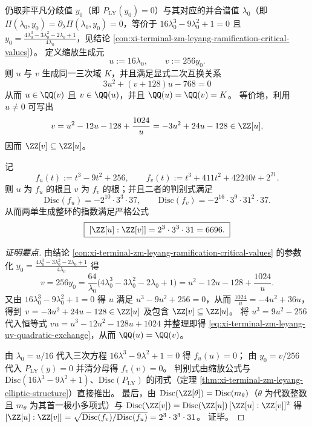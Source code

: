 \begin{conclusion}\label{con:xi-terminal-zm-leyang-uv-quadratic-exchange-index}
仍取非平凡分歧值 \(y_0\)（即 \(P_{\mathrm{LY}}(y_0)=0\)）与其对应的并合谱值 \(\lambda_0\)（即 \(\Pi(\lambda_0,y_0)=\partial_\lambda\Pi(\lambda_0,y_0)=0\)，等价于 \(16\lambda_0^3-9\lambda_0^2+1=0\) 且 \(y_0=\frac{4\lambda_0^3-3\lambda_0^2-2\lambda_0+1}{4\lambda_0}\)，见结论 \ref{con:xi-terminal-zm-leyang-ramification-critical-values}）。
定义缩放生成元
\[
u:=16\lambda_0,\qquad v:=256y_0.
\]
则 \(u\) 与 \(v\) 生成同一三次域 \(K\)，并且满足显式二次互换关系
\begin{equation}\label{eq:xi-terminal-zm-leyang-uv-quadratic-exchange}
\boxed{\;
3u^2+(v+128)u-768=0\;}
\end{equation}
从而 \(u\in\QQ(v)\) 且 \(v\in\QQ(u)\)，并且 \(\QQ(u)=\QQ(v)=K\)。
等价地，利用 \(u\neq 0\) 可写出
\[
v=u^2-12u-128+\frac{1024}{u}=-3u^2+24u-128\in\ZZ[u],
\]
因而 \(\ZZ[v]\subseteq \ZZ[u]\)。
\par
记
\[
f_u(t):=t^3-9t^2+256,\qquad
f_v(t):=t^3+411t^2+42240t+2^{21}.
\]
则 \(u\) 为 \(f_u\) 的根且 \(v\) 为 \(f_v\) 的根；并且二者的判别式满足
\[
\mathrm{Disc}(f_u)=-2^{10}\cdot 3^{3}\cdot 37,\qquad
\mathrm{Disc}(f_v)=-2^{16}\cdot 3^{9}\cdot 31^{2}\cdot 37.
\]
从而两单生成整环的指数满足严格公式
\begin{equation}\label{eq:xi-terminal-zm-leyang-uv-index}
\boxed{\;
[\ZZ[u]:\ZZ[v]]=2^3\cdot 3^3\cdot 31=6696.\;}
\end{equation}
\end{conclusion}
\begin{proof}[证明要点]
由结论 \ref{con:xi-terminal-zm-leyang-ramification-critical-values} 的参数化
\(
y_0=\frac{4\lambda_0^3-3\lambda_0^2-2\lambda_0+1}{4\lambda_0}
\)
得
\[
v
=256y_0
=\frac{64}{\lambda_0}\bigl(4\lambda_0^3-3\lambda_0^2-2\lambda_0+1\bigr)
=u^2-12u-128+\frac{1024}{u}.
\]
又由 \(16\lambda_0^3-9\lambda_0^2+1=0\) 得 \(u\) 满足 \(u^3-9u^2+256=0\)，从而 \(\frac{1024}{u}=-4u^2+36u\)，得到 \(v=-3u^2+24u-128\in\ZZ[u]\) 及包含 \(\ZZ[v]\subseteq\ZZ[u]\)。
将 \(u^3=9u^2-256\) 代入恒等式 \(vu=u^3-12u^2-128u+1024\) 并整理即得 \eqref{eq:xi-terminal-zm-leyang-uv-quadratic-exchange}，从而 \(\QQ(u)=\QQ(v)\)。
\par
由 \(\lambda_0=u/16\) 代入三次方程 \(16\lambda^3-9\lambda^2+1=0\) 得 \(f_u(u)=0\)；
由 \(y_0=v/256\) 代入 \(P_{\mathrm{LY}}(y)=0\) 并清分母得 \(f_v(v)=0\)。
判别式由缩放公式与 \(\mathrm{Disc}(16\lambda^3-9\lambda^2+1)\)、\(\mathrm{Disc}(P_{\mathrm{LY}})\) 的闭式（定理 \ref{thm:xi-terminal-zm-leyang-elliptic-structure}）直接推出。
最后，由 \(\mathrm{Disc}(\ZZ[\theta])=\mathrm{Disc}(m_\theta)\)（\(\theta\) 为代数整数且 \(m_\theta\) 为其首一极小多项式）与
\(
\mathrm{Disc}(\ZZ[v])=\mathrm{Disc}(\ZZ[u])\,[\ZZ[u]:\ZZ[v]]^{2}
\)
得
\(
[\ZZ[u]:\ZZ[v]]=\sqrt{\mathrm{Disc}(f_v)/\mathrm{Disc}(f_u)}=2^3\cdot 3^3\cdot 31
\)。
证毕。
\end{proof}

